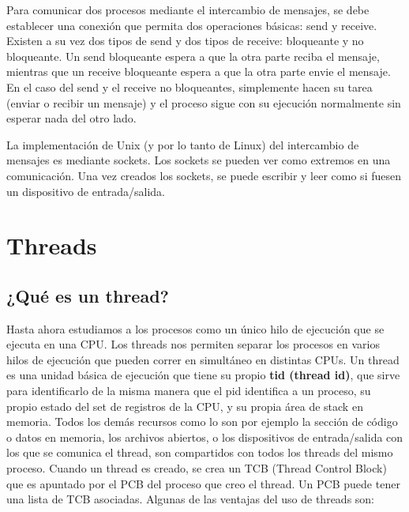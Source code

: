 \documentclass{article}
\begin{document}
Para comunicar dos procesos mediante el intercambio de mensajes, se debe establecer una conexi\'on que permita dos operaciones b\'asicas: send y receive. Existen a su vez dos tipos de send y dos tipos de receive: bloqueante y no bloqueante. Un send bloqueante espera a que la otra parte reciba el mensaje, mientras que un receive bloqueante espera a que la otra parte envie el mensaje. En el caso del send y el receive no bloqueantes, simplemente hacen su tarea (enviar o recibir un mensaje) y el proceso sigue con su ejecuci\'on normalmente sin esperar nada del otro lado.

La implementaci\'on de Unix (y por lo tanto de Linux) del intercambio de mensajes es mediante sockets. Los sockets se pueden ver como extremos en una comunicaci\'on. Una vez creados los sockets, se puede escribir y leer como si fuesen un dispositivo de entrada/salida.

\section{Threads}

\subsection{¿Qu\'e es un thread?}

Hasta ahora estudiamos a los procesos como un \'unico hilo de ejecuci\'on que se ejecuta en una CPU. Los threads nos permiten separar los procesos en varios hilos de ejecuci\'on que pueden correr en simult\'aneo en distintas CPUs. Un thread es una unidad b\'asica de ejecuci\'on que tiene su propio \textbf{tid (thread id)}, que sirve para identificarlo de la misma manera que el pid identifica a un proceso, su propio estado del set de registros de la CPU, y su propia \'area de stack en memoria. Todos los dem\'as recursos como lo son por ejemplo la secci\'on de c\'odigo o datos en memoria, los archivos abiertos, o los dispositivos de entrada/salida con los que se comunica el thread, son compartidos con todos los threads del mismo proceso. Cuando un thread es creado, se crea un TCB (Thread Control Block) que es apuntado por el PCB del proceso que creo el thread. Un PCB puede tener una lista de TCB asociadas. Algunas de las ventajas del uso de threads son:
\end{document}
